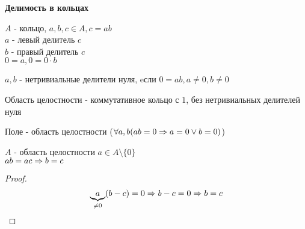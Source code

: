 \textbf{Делимость в кольцах}

$A$ - кольцо, $a, b, c \in A, c = ab$\\
$a$ - левый делитель $c$\\
$b$ - правый делитель $c$\\
$ 0 = a, 0 = 0 \cdot b$ \\
    
\begin{Def}
	$a, b$ - нетривиальные делители нуля, eсли $0 = ab, a \neq 0, b \neq 0$\\
\end{Def}
	
\begin{Def}	
	Область целостности - коммутативное кольцо с $1$, без нетривиальных делителей нуля\\
\end{Def}

\begin{Rem}
	Поле - область целостности ($\forall a, b (ab = 0 \Rightarrow a = 0 \vee b = 0)$)\\
\end{Rem}
	
\begin{theorem}{}
	$A$ - область целостности $a \in A \setminus \lbrace 0 \rbrace$\\
	$ab = ac \Rightarrow b = c$
\end{theorem}
	
\begin{proof}
	$$ \underbrace{a}_{\neq 0}(b - c) = 0 \Rightarrow b - c = 0 \Rightarrow b = c$$
\end{proof}